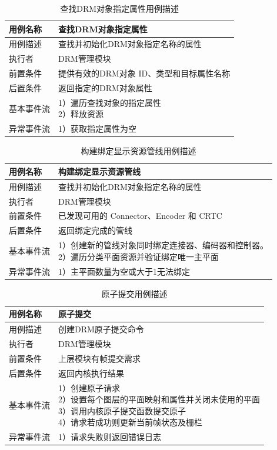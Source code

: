 \begin{table}[H]
  \centering
  \caption{查找DRM对象指定属性用例描述}
  \label{tab:查找DRM对象指定属性用例描述}
  \begin{tabular}{ll}
    \toprule
    用例名称  & 查找DRM对象指定属性 \\
    \midrule
    用例描述 & 查找并初始化DRM对象指定名称的属性 \\
    执行者 & DRM管理模块 \\
    前置条件 & 提供有效的DRM对象 ID、类型和目标属性名称 \\
    后置条件 & 返回指定的DRM对象属性 \\
    基本事件流 & \makecell[l]{1）遍历查找对象的指定属性\\2）释放资源} \\
    异常事件流 & 1）获取指定属性为空 \\
    \bottomrule
  \end{tabular}
  \note{}
\end{table}

\begin{table}[H]
  \centering
  \caption{构建绑定显示资源管线用例描述}
  \label{tab:构建绑定显示资源管线用例描述}
  \begin{tabular}{ll}
    \toprule
    用例名称  & 构建绑定显示资源管线 \\
    \midrule
    用例描述 & 查找并初始化DRM对象指定名称的属性 \\
    执行者 & DRM管理模块 \\
    前置条件 & 已发现可用的 Connector、Encoder 和 CRTC \\
    后置条件 & 返回绑定完成的管线 \\
    基本事件流 & \makecell[l]{1）创建新的管线对象同时绑定连接器、编码器和控制器。\\2）遍历分类平面资源并验证绑定唯一主平面} \\
    异常事件流 & 1）主平面数量为空或大于1无法绑定 \\
    \bottomrule
  \end{tabular}
  \note{}
\end{table}

\begin{table}[H]
  \centering
  \caption{原子提交用例描述}
  \label{tab:原子提交用例描述}
  \begin{tabular}{ll}
    \toprule
    用例名称  & 原子提交 \\
    \midrule
    用例描述 & 创建DRM原子提交命令 \\
    执行者 & DRM管理模块 \\
    前置条件 & 上层模块有帧提交需求 \\
    后置条件 & 返回内核执行结果 \\
    基本事件流 & \makecell[l]{1）创建原子请求\\
    2）设置每个图层的平面映射和属性并关闭未使用的平面\\
    3）调用内核原子提交函数提交原子\\
    4）请求若成功则更新当前帧状态及栅栏} \\
    异常事件流 & 1）请求失败则返回错误日志  \\
    \bottomrule
  \end{tabular}
  \note{}
\end{table}

